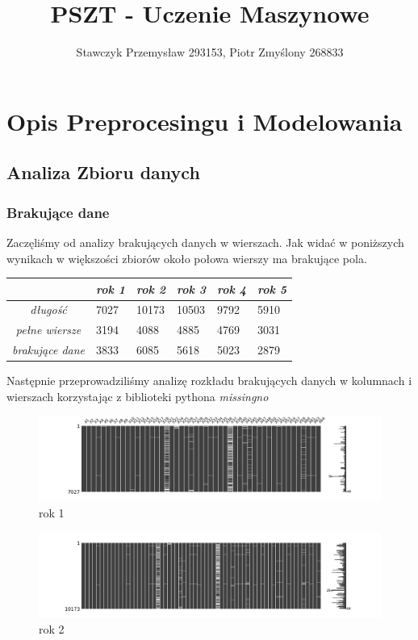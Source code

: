 \documentclass[11pt]{article}
\title{PSZT - Uczenie Maszynowe}
\author{Stawczyk Przemysław 293153, Piotr Zmyślony 268833}
\date{} %
\begin{document}
	\maketitle
	\setcounter{secnumdepth}{3}
	\setcounter{tocdepth}{3}
	\tableofcontents
	\clearpage

\section{Opis Preprocesingu i Modelowania}
\subsection{Analiza Zbioru danych}
\subsubsection{Brakujące dane}
Zaczęliśmy od analizy brakujących danych w wierszach. Jak widać w poniższych wynikach w większości zbiorów około połowa wierszy ma brakujące pola.
\begin{center}
\begin{tabular}{|c|m{0.7in}|m{0.7in}|m{0.7in}|m{0.7in}|m{0.7in}|}
	\hline
	& \textit{rok 1} & \textit{rok 2} & \textit{rok 3} & \textit{rok 4} & \textit{rok 5} \\ \hline
	\textit{długość} & 7027 & 10173 & 10503 & 9792 & 5910 \\ \hline
	\textit{pełne wiersze} & 3194 & 4088 & 4885 & 4769 & 3031 \\ \hline
	\textit{brakujące dane} & 3833 & 6085 & 5618 & 5023 & 2879 \\ \hline
\end{tabular}
\end{center}
Następnie przeprowadziliśmy analizę rozkładu brakujących danych w kolumnach i wierszach korzystając z biblioteki pythona \textit{missingno}\\

\begin{figure}[h]
\caption{rok 1}
	\includegraphics[width=\textwidth]{year_1}
\end{figure}

\begin{figure}[h]
\caption{rok 2}
	\includegraphics[width=\textwidth]{year_2}
\end{figure}
\end{document}
